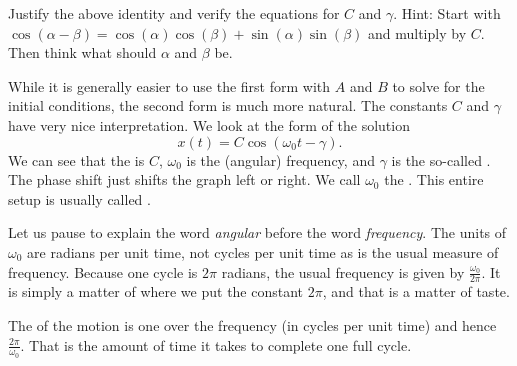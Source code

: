 \documentclass[12pt]{book}
\begin{document}
\begin{exercise}
Justify the above identity and verify the equations for $C$
and $\gamma$.  Hint: Start with
$\cos (\alpha-\beta) = \cos (\alpha) \cos
(\beta) + \sin (\alpha)\sin (\beta)$ and multiply by $C$.  Then think what should
$\alpha$ and $\beta$ be.
\end{exercise}

While it is generally easier to use the first form with $A$ and $B$
to solve for the initial conditions, the second form is much
more natural.  The constants $C$ and $\gamma$ have very nice interpretation.
We look at the form of the solution
\begin{equation*}
x(t) = C \cos ( \omega_0 t - \gamma ) .
\end{equation*}
We can see that the \emph{} is $C$, $\omega_0$ is the (angular)
frequency, and $\gamma$ is the so-called \emph{}.
The phase shift just shifts the
graph left or right.
We call $\omega_0$ the \emph{}.
This entire setup is usually  
called \emph{}.

Let us pause to explain the word \emph{angular}
before the word \emph{frequency}.
The units of
$\omega_0$ are radians per unit time, not cycles per unit time 
as is the usual measure of frequency.  Because one cycle is $2
\pi$ radians, the usual frequency is given by $\frac{\omega_0}{2\pi}$.
It is simply a matter of where we put the constant $2\pi$, and that is a
matter of taste.

The \emph{} of the motion is one over the frequency (in cycles per unit
time) and hence $\frac{2\pi}{\omega_0}$.  That is the amount of time it takes
to complete one full cycle.
\end{document}
